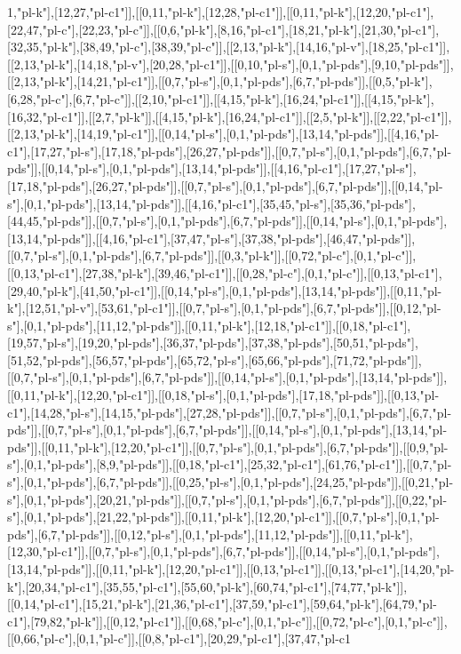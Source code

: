 1,"pl-k"],[12,27,"pl-c1"]],[[0,11,"pl-k"],[12,28,"pl-c1"]],[[0,11,"pl-k"],[12,20,"pl-c1"],[22,47,"pl-c"],[22,23,"pl-c"]],[[0,6,"pl-k"],[8,16,"pl-c1"],[18,21,"pl-k"],[21,30,"pl-c1"],[32,35,"pl-k"],[38,49,"pl-c"],[38,39,"pl-c"]],[[2,13,"pl-k"],[14,16,"pl-v"],[18,25,"pl-c1"]],[[2,13,"pl-k"],[14,18,"pl-v"],[20,28,"pl-c1"]],[[0,10,"pl-s"],[0,1,"pl-pds"],[9,10,"pl-pds"]],[[2,13,"pl-k"],[14,21,"pl-c1"]],[[0,7,"pl-s"],[0,1,"pl-pds"],[6,7,"pl-pds"]],[[0,5,"pl-k"],[6,28,"pl-c"],[6,7,"pl-c"]],[[2,10,"pl-c1"]],[[4,15,"pl-k"],[16,24,"pl-c1"]],[[4,15,"pl-k"],[16,32,"pl-c1"]],[[2,7,"pl-k"]],[[4,15,"pl-k"],[16,24,"pl-c1"]],[[2,5,"pl-k"]],[[2,22,"pl-c1"]],[[2,13,"pl-k"],[14,19,"pl-c1"]],[[0,14,"pl-s"],[0,1,"pl-pds"],[13,14,"pl-pds"]],[[4,16,"pl-c1"],[17,27,"pl-s"],[17,18,"pl-pds"],[26,27,"pl-pds"]],[[0,7,"pl-s"],[0,1,"pl-pds"],[6,7,"pl-pds"]],[[0,14,"pl-s"],[0,1,"pl-pds"],[13,14,"pl-pds"]],[[4,16,"pl-c1"],[17,27,"pl-s"],[17,18,"pl-pds"],[26,27,"pl-pds"]],[[0,7,"pl-s"],[0,1,"pl-pds"],[6,7,"pl-pds"]],[[0,14,"pl-s"],[0,1,"pl-pds"],[13,14,"pl-pds"]],[[4,16,"pl-c1"],[35,45,"pl-s"],[35,36,"pl-pds"],[44,45,"pl-pds"]],[[0,7,"pl-s"],[0,1,"pl-pds"],[6,7,"pl-pds"]],[[0,14,"pl-s"],[0,1,"pl-pds"],[13,14,"pl-pds"]],[[4,16,"pl-c1"],[37,47,"pl-s"],[37,38,"pl-pds"],[46,47,"pl-pds"]],[[0,7,"pl-s"],[0,1,"pl-pds"],[6,7,"pl-pds"]],[[0,3,"pl-k"]],[[0,72,"pl-c"],[0,1,"pl-c"]],[[0,13,"pl-c1"],[27,38,"pl-k"],[39,46,"pl-c1"]],[[0,28,"pl-c"],[0,1,"pl-c"]],[[0,13,"pl-c1"],[29,40,"pl-k"],[41,50,"pl-c1"]],[[0,14,"pl-s"],[0,1,"pl-pds"],[13,14,"pl-pds"]],[[0,11,"pl-k"],[12,51,"pl-v"],[53,61,"pl-c1"]],[[0,7,"pl-s"],[0,1,"pl-pds"],[6,7,"pl-pds"]],[[0,12,"pl-s"],[0,1,"pl-pds"],[11,12,"pl-pds"]],[[0,11,"pl-k"],[12,18,"pl-c1"]],[[0,18,"pl-c1"],[19,57,"pl-s"],[19,20,"pl-pds"],[36,37,"pl-pds"],[37,38,"pl-pds"],[50,51,"pl-pds"],[51,52,"pl-pds"],[56,57,"pl-pds"],[65,72,"pl-s"],[65,66,"pl-pds"],[71,72,"pl-pds"]],[[0,7,"pl-s"],[0,1,"pl-pds"],[6,7,"pl-pds"]],[[0,14,"pl-s"],[0,1,"pl-pds"],[13,14,"pl-pds"]],[[0,11,"pl-k"],[12,20,"pl-c1"]],[[0,18,"pl-s"],[0,1,"pl-pds"],[17,18,"pl-pds"]],[[0,13,"pl-c1"],[14,28,"pl-s"],[14,15,"pl-pds"],[27,28,"pl-pds"]],[[0,7,"pl-s"],[0,1,"pl-pds"],[6,7,"pl-pds"]],[[0,7,"pl-s"],[0,1,"pl-pds"],[6,7,"pl-pds"]],[[0,14,"pl-s"],[0,1,"pl-pds"],[13,14,"pl-pds"]],[[0,11,"pl-k"],[12,20,"pl-c1"]],[[0,7,"pl-s"],[0,1,"pl-pds"],[6,7,"pl-pds"]],[[0,9,"pl-s"],[0,1,"pl-pds"],[8,9,"pl-pds"]],[[0,18,"pl-c1"],[25,32,"pl-c1"],[61,76,"pl-c1"]],[[0,7,"pl-s"],[0,1,"pl-pds"],[6,7,"pl-pds"]],[[0,25,"pl-s"],[0,1,"pl-pds"],[24,25,"pl-pds"]],[[0,21,"pl-s"],[0,1,"pl-pds"],[20,21,"pl-pds"]],[[0,7,"pl-s"],[0,1,"pl-pds"],[6,7,"pl-pds"]],[[0,22,"pl-s"],[0,1,"pl-pds"],[21,22,"pl-pds"]],[[0,11,"pl-k"],[12,20,"pl-c1"]],[[0,7,"pl-s"],[0,1,"pl-pds"],[6,7,"pl-pds"]],[[0,12,"pl-s"],[0,1,"pl-pds"],[11,12,"pl-pds"]],[[0,11,"pl-k"],[12,30,"pl-c1"]],[[0,7,"pl-s"],[0,1,"pl-pds"],[6,7,"pl-pds"]],[[0,14,"pl-s"],[0,1,"pl-pds"],[13,14,"pl-pds"]],[[0,11,"pl-k"],[12,20,"pl-c1"]],[[0,13,"pl-c1"]],[[0,13,"pl-c1"],[14,20,"pl-k"],[20,34,"pl-c1"],[35,55,"pl-c1"],[55,60,"pl-k"],[60,74,"pl-c1"],[74,77,"pl-k"]],[[0,14,"pl-c1"],[15,21,"pl-k"],[21,36,"pl-c1"],[37,59,"pl-c1"],[59,64,"pl-k"],[64,79,"pl-c1"],[79,82,"pl-k"]],[[0,12,"pl-c1"]],[[0,68,"pl-c"],[0,1,"pl-c"]],[[0,72,"pl-c"],[0,1,"pl-c"]],[[0,66,"pl-c"],[0,1,"pl-c"]],[[0,8,"pl-c1"],[20,29,"pl-c1"],[37,47,"pl-c1